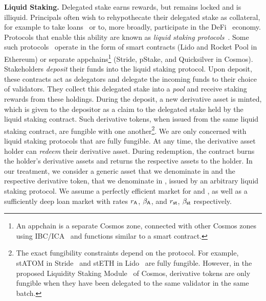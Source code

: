 \noindent
\textbf{Liquid Staking.} Delegated stake earns rewards, but remains locked and
is illiquid. Principals often wish to rehypothecate their delegated stake as collateral,
for example to take loans~\cite{gudgeon2020defi} or to, more broadly, participate in the
DeFi~\cite{defi-sok} economy. Protocols that enable this ability are known as
\emph{liquid staking protocols}~\cite{liquid-staking-report}.
Some such protocols~\cite{lido,stride} operate
in the form of smart contracts (\eg Lido and Rocket Pool in Ethereum) or separate
appchains\footnote{An appchain is a separate Cosmos zone, connected with other
Cosmos zones using IBC/ICA~\cite{ibc-ica} and functions similar to a smart contract.}
(\eg Stride, pStake, and Quicksilver in Cosmos).
Stakeholders \emph{deposit} their funds into the liquid staking protocol.
Upon deposit, these contracts act as
delegators and delegate the incoming funds to their choice of validators.
They collect this delegated stake into a \emph{pool} and receive staking
rewards from these holdings.
During the deposit, a new derivative asset is minted,
which is given to the depositor as a claim to the delegated stake held by the
liquid staking contract. Such derivative tokens, when issued from the same liquid
staking contract, are fungible with one another\footnote{The exact fungibility
constraints depend on the protocol. For example,
\textsf{stATOM} in Stride~\cite{stride} and \textsf{stETH} in Lido~\cite{lido} are fully fungible.
However, in the proposed Liquidity Staking
Module~\cite{liquidity-staking-module} of Cosmos,
derivative tokens are only fungible when they have been
delegated to the same validator in the same batch.}. We are only concerned with liquid
staking protocols that are fully fungible. At any time, the derivative asset holder
can \emph{redeem} their derivative asset.
During redemption, the contract burns
the holder's derivative assets and returns the respective assets to the holder.
In our treatment, we consider a generic asset that we denominate in \asset
and the respective derivative token, that we denominate in \stasset,
issued by an arbitrary liquid staking protocol.
We assume a perfectly efficient market for \asset and \stasset,
as well as a sufficiently deep loan market with rates
$r_{\textsf{A}}$, $\beta_{\textsf{A}}$, and $r_{\textsf{st}}$, $\beta_{\textsf{st}}$ respectively.

